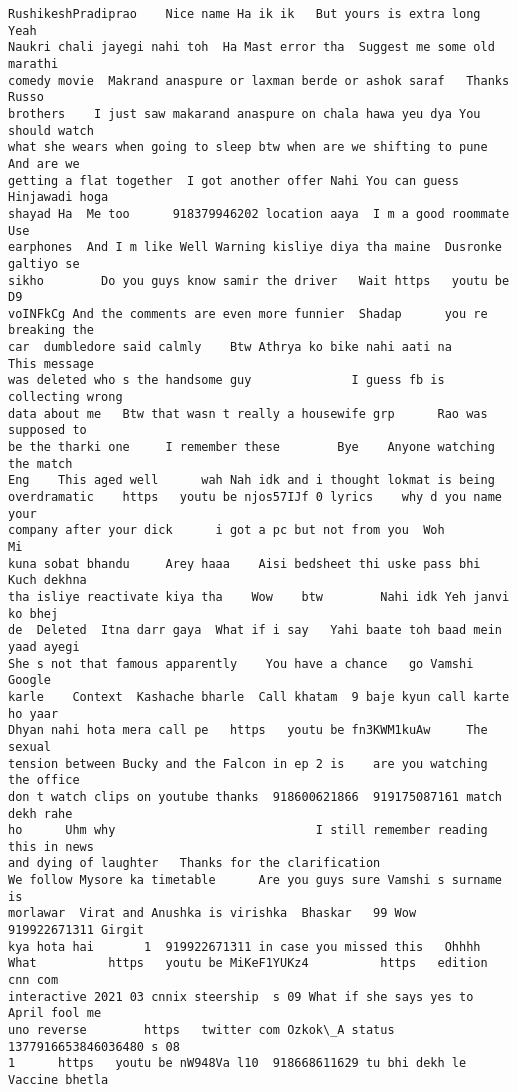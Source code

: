 \documentclass[11pt]{article}
\begin{document}
\begin{tcolorbox}[breakable, size=fbox, boxrule=.5pt, pad at break*=1mm, opacityfill=0]
\begin{Verbatim}[commandchars=\\\{\}]
RushikeshPradiprao    Nice name Ha ik ik   But yours is extra long        Yeah
Naukri chali jayegi nahi toh  Ha Mast error tha  Suggest me some old marathi
comedy movie  Makrand anaspure or laxman berde or ashok saraf   Thanks Russo
brothers    I just saw makarand anaspure on chala hawa yeu dya You should watch
what she wears when going to sleep btw when are we shifting to pune  And are we
getting a flat together  I got another offer Nahi You can guess   Hinjawadi hoga
shayad Ha  Me too      918379946202 location aaya  I m a good roommate Use
earphones  And I m like Well Warning kisliye diya tha maine  Dusronke galtiyo se
sikho        Do you guys know samir the driver   Wait https   youtu be D9
voINFkCg And the comments are even more funnier  Shadap      you re breaking the
car  dumbledore said calmly    Btw Athrya ko bike nahi aati na      This message
was deleted who s the handsome guy              I guess fb is collecting wrong
data about me   Btw that wasn t really a housewife grp      Rao was supposed to
be the tharki one     I remember these        Bye    Anyone watching the match
Eng    This aged well      wah Nah idk and i thought lokmat is being
overdramatic    https   youtu be njos57IJf 0 lyrics    why d you name your
company after your dick      i got a pc but not from you  Woh             Mi
kuna sobat bhandu     Arey haaa    Aisi bedsheet thi uske pass bhi Kuch dekhna
tha isliye reactivate kiya tha    Wow    btw        Nahi idk Yeh janvi ko bhej
de  Deleted  Itna darr gaya  What if i say   Yahi baate toh baad mein yaad ayegi
She s not that famous apparently    You have a chance   go Vamshi    Google
karle    Context  Kashache bharle  Call khatam  9 baje kyun call karte ho yaar
Dhyan nahi hota mera call pe   https   youtu be fn3KWM1kuAw     The sexual
tension between Bucky and the Falcon in ep 2 is    are you watching the office
don t watch clips on youtube thanks  918600621866  919175087161 match dekh rahe
ho      Uhm why                            I still remember reading this in news
and dying of laughter   Thanks for the clarification
We follow Mysore ka timetable      Are you guys sure Vamshi s surname is
morlawar  Virat and Anushka is virishka  Bhaskar   99 Wow  919922671311 Girgit
kya hota hai       1  919922671311 in case you missed this   Ohhhh
What          https   youtu be MiKeF1YUKz4          https   edition cnn com
interactive 2021 03 cnnix steership  s 09 What if she says yes to April fool me
uno reverse        https   twitter com Ozkok\_A status 1377916653846036480 s 08
1      https   youtu be nW948Va l10  918668611629 tu bhi dekh le Vaccine bhetla

\end{Verbatim}
\end{tcolorbox}
\end{document}
